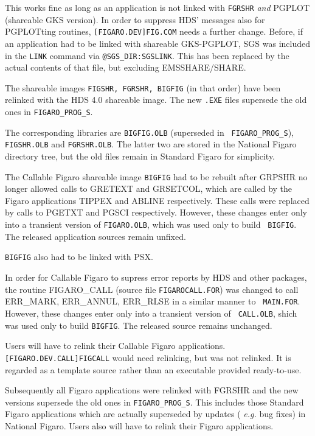 This works fine as long as an application is not linked with {\tt FGRSHR} {\it
and} PGPLOT (shareable GKS version). In order to suppress HDS' messages also
for PGPLOTting routines, {\tt [FIGARO.\-DEV]\-FIG.COM} needs a further change.
Before, if an application had to be linked with shareable GKS-PGPLOT, SGS was
included in the {\tt LINK} command via {\tt @SGS\_DIR:SGSLINK}. This has been
replaced by the actual contents of that file, but excluding EMSSHARE/SHARE.

The shareable images {\tt FIGSHR, FGRSHR, BIGFIG} (in that order) have been
relinked with the HDS 4.0 shareable image. The new {\tt .EXE} files supersede
the old ones in {\tt FIGARO\_\-PROG\_S}.

The corresponding libraries are {\tt BIGFIG.OLB} (superseded in {\tt
FIGARO\_\-PROG\_S}), {\tt FIGSHR.OLB} and {\tt FGRSHR.OLB}. The latter two are
stored in the National Figaro directory tree, but the old files remain in
Standard Figaro for simplicity.

The Callable Figaro shareable image {\tt BIGFIG} had to be rebuilt after GRPSHR
no longer allowed calls to GRETEXT and GRSETCOL, which are called by the Figaro
applications TIPPEX and ABLINE respectively. These calls were replaced by calls
to PGETXT and PGSCI respectively. However, these changes enter only into a
transient version of {\tt FIGARO.OLB}, which was used only to build {\tt
BIGFIG}. The released application sources remain unfixed.

{\tt BIGFIG} also had to be linked with PSX.

In order for Callable Figaro to supress error reports by HDS and other
packages, the routine FIGARO\_CALL (source file {\tt FIGAROCALL.FOR}) was
changed to call ERR\_MARK, ERR\_ANNUL, ERR\_RLSE in a similar manner to {\tt
MAIN.FOR}. However, these changes enter only into a transient version of {\tt
CALL.OLB}, shich was used only to build {\tt BIGFIG}. The released source
remains unchanged.

Users will have to relink their Callable Figaro applications. {\tt
[FIGARO.\-DEV.\-CALL]\-FIGCALL} would need relinking, but was not relinked. It
is regarded as a template source rather than an executable provided
ready-to-use.

Subsequently all Figaro applications were relinked with FGRSHR and the new
versions supersede the old ones in {\tt FIGARO\_\-PROG\_S}. This includes those
Standard Figaro applications which are actually superseded by updates ({\em
e.g.\/} bug fixes) in National Figaro. Users also will have to relink their
Figaro applications.

